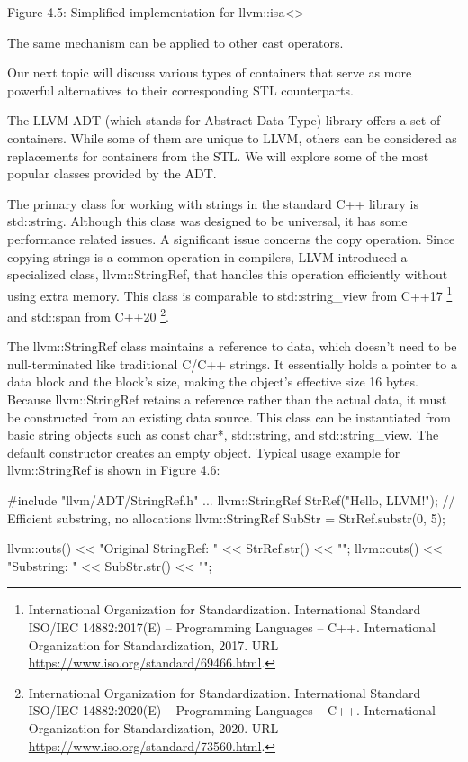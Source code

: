 \begin{center}
Figure 4.5: Simplified implementation for llvm::isa<>
\end{center}

The same mechanism can be applied to other cast operators.

Our next topic will discuss various types of containers that serve as more powerful alternatives to their corresponding STL counterparts.


The LLVM ADT (which stands for Abstract Data Type) library offers a set of containers. While some of them are unique to LLVM, others can be considered as replacements for containers from the STL. We will explore some of the most popular classes provided by the ADT.


The primary class for working with strings in the standard C++ library is std::string. Although this class was designed to be universal, it has some performance related issues. A significant issue concerns the copy operation. Since copying strings is a common operation in compilers, LLVM introduced a specialized class, llvm::StringRef, that handles this operation efficiently without using extra memory. This class is comparable to std::string\_view from C++17 \footnote{International Organization for Standardization. International Standard ISO/IEC 14882:2017(E) – Programming Languages – C++. International Organization for Standardization, 2017. URL \url{https://www.iso.org/standard/69466.html}.} and std::span from C++20 \footnote{International Organization for Standardization. International Standard ISO/IEC 14882:2020(E) – Programming Languages – C++. International Organization for Standardization, 2020. URL \url{https://www.iso.org/standard/73560.html}.}.

The llvm::StringRef class maintains a reference to data, which doesn't need to be null-terminated like traditional C/C++ strings. It essentially holds a pointer to a data block and the block's size, making the object's effective size 16 bytes. Because llvm::StringRef retains a reference rather than the actual data, it must be constructed from an existing data source. This class can be instantiated from basic string objects such as const char*, std::string, and std::string\_view. The default constructor creates an empty object. Typical usage example for llvm::StringRef is shown in Figure 4.6:

\begin{cpp}
#include "llvm/ADT/StringRef.h"
...
llvm::StringRef StrRef("Hello, LLVM!");
// Efficient substring, no allocations
llvm::StringRef SubStr = StrRef.substr(0, 5);

llvm::outs() << "Original StringRef: " << StrRef.str() << "\n";
llvm::outs() << "Substring: " << SubStr.str() << "\n";
\end{cpp}

